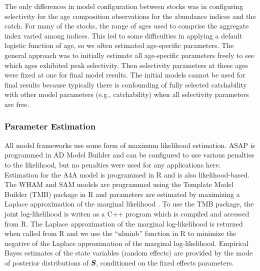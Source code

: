\documentclass[12pt,letterpaper, leqno]{article}
\begin{document}
The only differences in model configuration between stocks was in configuring selectivity for the age composition observations for the abundance indices and the catch. For many of the stocks, the range of ages used to comprise the aggregate index varied among indices. This led to some difficulties in applying a default logistic function of age, so we often estimated age-specific parameters. The general approach was to initially estimate all age-specific parameters freely to see which ages exhibited peak selectivity. Then selectivity parameters at these ages were fixed at one for final model results. The initial models cannot be used for final results because typically there is confounding of fully selected catchability with other model parameters (e.g., catchability) when all selectivity parameters are free.

\subsubsection*{Parameter Estimation}


All model frameworks use some form of maximum likelihood estimation. ASAP is programmed in AD Model Builder \citep{fournieretal12} and can be configured to use various penalties to the likelihood, but no penalties were used for any applications here. Estimation for the A4A model is programmed in R \citep{R18} and is also likelihood-based. The WHAM and SAM models are programmed using the Template Model Builder (TMB) package in R \citep{kristensenetal16} and parameters are estimated by maximizing a Laplace approximation of the marginal likelihood \citep{skaugfournier06}. To use the TMB package, the joint log-likelihood is writen as a C++ program which is compiled and accessed from R. The Laplace approximation of the marginal log-likelihood is returned when called from R and we use the ``nlminb'' function in R to minimize the negative of the Laplace approximation of the marginal log-likelihood. Empirical Bayes estimates of the state variables (random effects) are provided by the mode of posterior distributions of $\textsl{\textbf{S}}$, conditioned on the fixed effects parameters.
\end{document}
